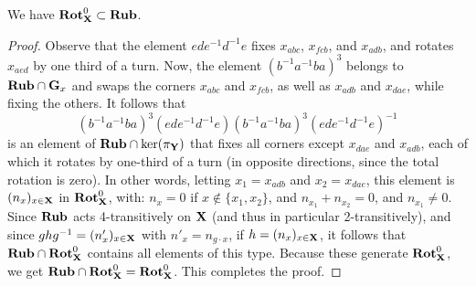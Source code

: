 \begin{itemize}
    \begin{lemma}
        \label{lem:RotX0}
        We have $\mathbf{Rot}_{\mathbf{X}}^0 \subset \mathbf{Rub}$.
    \end{lemma}
    \begin{proof}
        Observe that the element $ede^{-1}d^{-1}e$ fixes $x_{abc}$, $x_{fcb}$, and $x_{adb}$, and rotates $x_{aed}$ by one third of a turn.
        Now, the element $(b^{-1}a^{-1}ba)^{3}$ belongs to $\mathbf{Rub} \cap \mathbf{G}_{x}$ and swaps the corners $x_{abc}$ and $x_{fcb}$, as well as $x_{adb}$ and $x_{dae}$, while fixing the others.
        It follows that
        $$
        (b^{-1}a^{-1}ba)^{3} (ede^{-1}d^{-1}e) (b^{-1}a^{-1}ba)^{3} (ede^{-1}d^{-1}e)^{-1}
        $$
        is an element of $\mathbf{Rub} \cap \ker(\pi_{\mathbf{Y}})$ that fixes all corners except $x_{dae}$ and $x_{adb}$, each of which it rotates by one-third of a turn (in opposite directions, since the total rotation is zero).
        In other words, letting $x_{1} = x_{adb}$ and $x_{2} = x_{dae}$, this element is $(n_{x})_{x \in \mathbf{X}}$ in $\mathbf{Rot}_{\mathbf{X}}^{0}$, with: $n_{x} = 0$ if $x \notin \{x_{1}, x_{2}\}$, and $n_{x_{1}} + n_{x_{2}} = 0$, and $n_{x_{1}} \neq 0$.
        Since $\mathbf{Rub}$ acts 4-transitively on $\mathbf{X}$ (and thus in particular 2-transitively), and since
        $ghg^{-1} = (n'_{x})_{x \in \mathbf{X}}$ with $n'_{x} = n_{g \cdot x}$, if $h = (n_{x})_{x \in \mathbf{X}}$,
        it follows that $\mathbf{Rub} \cap \mathbf{Rot}_{\mathbf{X}}^{0}$ contains all elements of this type.
        Because these generate $\mathbf{Rot}_{\mathbf{X}}^{0}$, we get $\mathbf{Rub} \cap \mathbf{Rot}_{\mathbf{X}}^{0} = \mathbf{Rot}_{\mathbf{X}}^{0}$. This completes the proof.
    \end{proof}


\end{itemize}

